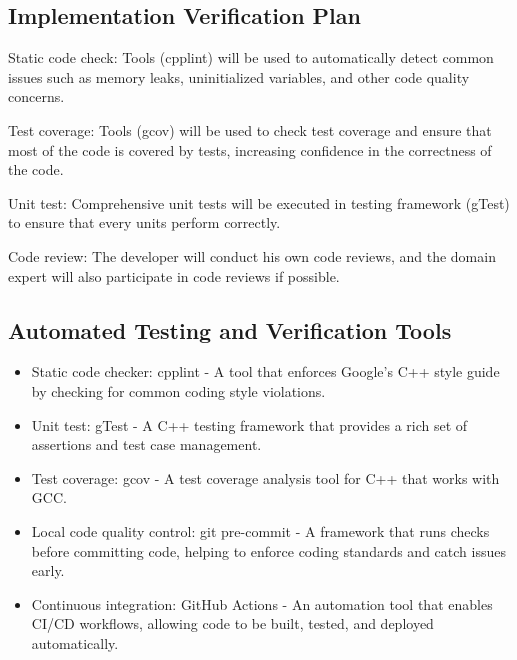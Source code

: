\documentclass[12pt, titlepage]{article}
\begin{document}
\subsection{Implementation Verification Plan}

\begin{todolist}
  \item Static code check: Tools (cpplint) will be used to automatically detect
  common issues such as memory leaks, uninitialized variables, and other code
  quality concerns.
  \item Test coverage: Tools (gcov) will be used to check test coverage and
  ensure that most of the code is covered by tests, increasing confidence in the
  correctness of the code.
  \item Unit test: Comprehensive unit tests will be executed in testing
  framework (gTest) to ensure that every units perform correctly.
  \item Code review: The developer will conduct his own code reviews, and the
  domain expert will also participate in code reviews if possible.
\end{todolist}




\subsection{Automated Testing and Verification Tools}

\begin{itemize}
  \item Static code checker: cpplint - A tool that enforces Google's C++ style
  guide by checking for common coding style violations.
  \item Unit test: gTest - A C++ testing framework that provides a rich set of
  assertions and test case management.
  \item Test coverage: gcov - A test coverage analysis tool for C++ that works
  with GCC.
  \item Local code quality control: git pre-commit - A framework that runs
  checks before committing code, helping to enforce coding standards and catch
  issues early.
  \item Continuous integration: GitHub Actions - An automation tool that enables
  CI/CD workflows, allowing code to be built, tested, and deployed
  automatically.
\end{itemize}
\end{document}
